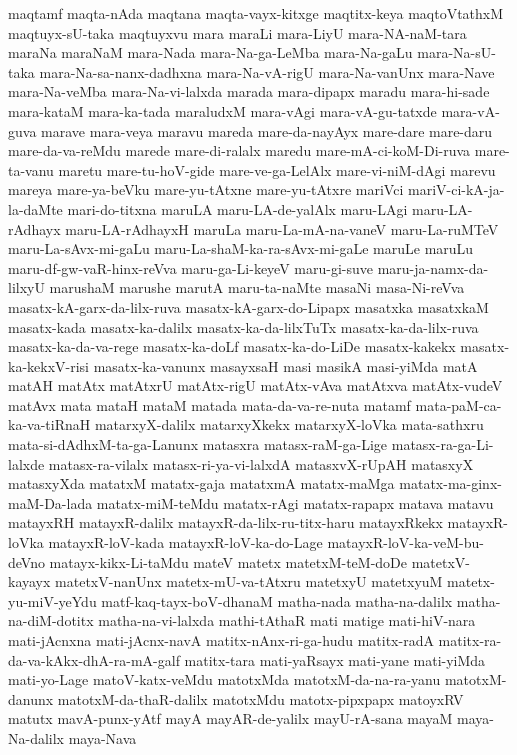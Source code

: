 {maqtamf
maqta-nAda
maqtana
maqta-vayx-kitxge
maqtitx-keya
maqtoVtathxM
maqtuyx-sU-taka
maqtuyxvu
mara
maraLi
mara-LiyU
mara-NA-naM-tara
maraNa
maraNaM
mara-Nada
mara-Na-ga-LeMba
mara-Na-gaLu
mara-Na-sU-taka
mara-Na-sa-nanx-dadhxna
mara-Na-vA-rigU
mara-Na-vanUnx
mara-Nave
mara-Na-veMba
mara-Na-vi-lalxda
marada
mara-dipapx
maradu
mara-hi-sade
mara-kataM
mara-ka-tada
maraludxM
mara-vAgi
mara-vA-gu-tatxde
mara-vA-guva
marave
mara-veya
maravu
mareda
mare-da-nayAyx
mare-dare
mare-daru
mare-da-va-reMdu
marede
mare-di-ralalx
maredu
mare-mA-ci-koM-Di-ruva
mare-ta-vanu
maretu
mare-tu-hoV-gide
mare-ve-ga-LelAlx
mare-vi-niM-dAgi
marevu
mareya
mare-ya-beVku
mare-yu-tAtxne
mare-yu-tAtxre
mariVci
mariV-ci-kA-ja-la-daMte
mari-do-titxna
maruLA
maru-LA-de-yalAlx
maru-LAgi
maru-LA-rAdhayx
maru-LA-rAdhayxH
maruLa
maru-La-mA-na-vaneV
maru-La-ruMTeV
maru-La-sAvx-mi-gaLu
maru-La-shaM-ka-ra-sAvx-mi-gaLe
maruLe
maruLu
maru-df-gw-vaR-hinx-reVva
maru-ga-Li-keyeV
maru-gi-suve
maru-ja-namx-da-lilxyU
marushaM
marushe
marutA
maru-ta-naMte
masaNi
masa-Ni-reVva
masatx-kA-garx-da-lilx-ruva
masatx-kA-garx-do-Lipapx
masatxka
masatxkaM
masatx-kada
masatx-ka-dalilx
masatx-ka-da-lilxTuTx
masatx-ka-da-lilx-ruva
masatx-ka-da-va-rege
masatx-ka-doLf
masatx-ka-do-LiDe
masatx-kakekx
masatx-ka-kekxV-risi
masatx-ka-vanunx
masayxsaH
masi
masikA
masi-yiMda
matA
matAH
matAtx
matAtxrU
matAtx-rigU
matAtx-vAva
matAtxva
matAtx-vudeV
matAvx
mata
mataH
mataM
matada
mata-da-va-re-nuta
matamf
mata-paM-ca-ka-va-tiRnaH
matarxyX-dalilx
matarxyXkekx
matarxyX-loVka
mata-sathxru
mata-si-dAdhxM-ta-ga-Lanunx
matasxra
matasx-raM-ga-Lige
matasx-ra-ga-Li-lalxde
matasx-ra-vilalx
matasx-ri-ya-vi-lalxdA
matasxvX-rUpAH
matasxyX
matasxyXda
matatxM
matatx-gaja
matatxmA
matatx-maMga
matatx-ma-ginx-maM-Da-lada
matatx-miM-teMdu
matatx-rAgi
matatx-rapapx
matava
matavu
matayxRH
matayxR-dalilx
matayxR-da-lilx-ru-titx-haru
matayxRkekx
matayxR-loVka
matayxR-loV-kada
matayxR-loV-ka-do-Lage
matayxR-loV-ka-veM-bu-deVno
matayx-kikx-Li-taMdu
mateV
matetx
matetxM-teM-doDe
matetxV-kayayx
matetxV-nanUnx
matetx-mU-va-tAtxru
matetxyU
matetxyuM
matetx-yu-miV-yeYdu
matf-kaq-tayx-boV-dhanaM
matha-nada
matha-na-dalilx
matha-na-diM-dotitx
matha-na-vi-lalxda
mathi-tAthaR
mati
matige
mati-hiV-nara
mati-jAcnxna
mati-jAcnx-navA
matitx-nAnx-ri-ga-hudu
matitx-radA
matitx-ra-da-va-kAkx-dhA-ra-mA-galf
matitx-tara
mati-yaRsayx
mati-yane
mati-yiMda
mati-yo-Lage
matoV-katx-veMdu
matotxMda
matotxM-da-na-ra-yanu
matotxM-danunx
matotxM-da-thaR-dalilx
matotxMdu
matotx-pipxpapx
matoyxRV
matutx
mavA-punx-yAtf
mayA
mayAR-de-yalilx
mayU-rA-sana
mayaM
maya-Na-dalilx
maya-Nava
}
